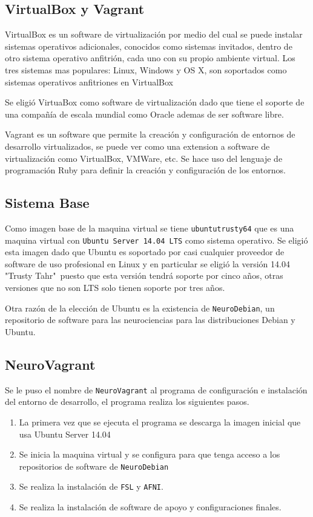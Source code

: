 \documentclass{article}
\begin{document}
\subsection{VirtualBox y Vagrant}

VirtualBox es un software de virtualización por medio del cual se puede instalar sistemas operativos adicionales, conocidos como sistemas invitados, dentro de otro sistema operativo anfitrión, cada uno con su propio ambiente virtual. Los tres sistemas mas populares: Linux, Windows y OS X, son soportados como sistemas operativos anfitriones en VirtualBox

Se eligió VirtuaBox como software de virtualización dado que tiene el soporte de una compañía de escala mundial como Oracle ademas de ser software libre.

Vagrant es un software que permite la creación y configuración de entornos de desarrollo virtualizados, se puede ver como una extension a software de virtualización como VirtualBox, VMWare, etc. Se hace uso del lenguaje de programación Ruby para definir la creación y configuración de los entornos.

\subsection{Sistema Base}

Como imagen base de la maquina virtual se tiene \texttt{ubuntu\/trusty64} que es una maquina virtual con \texttt{Ubuntu Server 14.04 LTS} como sistema operativo. Se eligió esta imagen dado que Ubuntu es soportado por casi cualquier proveedor de software de uso profesional en Linux y en particular se eligió la versión 14.04 "Trusty Tahr"\ puesto que esta versión tendrá soporte por cinco años, otras versiones que no son LTS solo tienen soporte por tres años.

Otra razón de la elección de Ubuntu es la existencia de \texttt{NeuroDebian}, un repositorio de software para las neurociencias para las distribuciones Debian y Ubuntu.

\subsection{NeuroVagrant}
Se le puso el nombre de \texttt{NeuroVagrant} al programa de configuración e instalación del entorno de desarrollo, el programa realiza los siguientes pasos.

\begin{enumerate}
  \item La primera vez que se ejecuta el programa se descarga la imagen inicial que usa Ubuntu Server 14.04
  \item Se inicia la maquina virtual y se configura para que tenga acceso a los repositorios de software de \texttt{NeuroDebian}
  \item Se realiza la instalación de \texttt{FSL} y \texttt{AFNI}.
  \item Se realiza la instalación de software de apoyo y configuraciones finales.
\end{enumerate}
\end{document}
